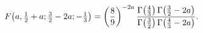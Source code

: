\[\mathop{F\/}\nolimits\!\left(a,\tfrac{1}{2}+a;\tfrac{3}{2}-2a;-\tfrac{1}{3}%
\right)=\left(\frac{8}{9}\right)^{-2a}\frac{\mathop{\Gamma\/}\nolimits\!\left(%
\tfrac{4}{3}\right)\mathop{\Gamma\/}\nolimits\!\left(\tfrac{3}{2}-2a\right)}{%
\mathop{\Gamma\/}\nolimits\!\left(\tfrac{3}{2}\right)\mathop{\Gamma\/}%
\nolimits\!\left(\tfrac{4}{3}-2a\right)}.\]